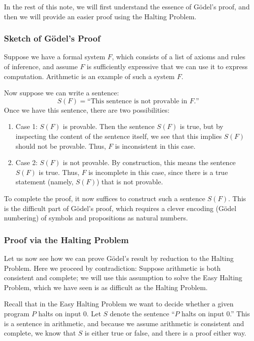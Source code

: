 \documentclass[11pt,fleqn]{article}
\begin{document}
In the rest of this note, we will first understand the essence of G\"odel's proof, and then we will provide an easier proof using the Halting Problem.


\subsubsection*{Sketch of G\"odel's Proof}

Suppose we have a formal system $F$, which consists of a list of axioms and rules of inference, and assume $F$ is sufficiently expressive that we can use it to express computation. Arithmetic is an example of such a system $F$.

Now suppose we can write a sentence:
$$S(F) = \text{``This sentence is not provable in $F$.''}$$
Once we have this sentence, there are two possibilities:
\begin{enumerate}
  \item Case 1: $S(F)$ is provable. Then the sentence $S(F)$ is true, but by inspecting the content of the sentence itself, we see that this implies $S(F)$ should not be provable. Thus, $F$ is inconsistent in this case.
  \item Case 2: $S(F)$ is not provable. By construction, this means the sentence $S(F)$ is true. Thus, $F$ is incomplete in this case, since there is a true statement (namely, $S(F)$) that is not provable.
\end{enumerate}

To complete the proof, it now suffices to construct such a sentence $S(F)$. This is the difficult part of G\"odel's proof, which requires a clever encoding (G\"odel numbering) of symbols and propositions as natural numbers.



\subsubsection*{Proof via the Halting Problem}

Let us now see how we can prove G\"odel's result by reduction to the Halting Problem. Here we proceed by contradiction: Suppose arithmetic is both consistent and complete; we will use this assumption to solve the Easy Halting Problem, which we have seen is as difficult as the Halting Problem.

Recall that in the Easy Halting Problem we want to decide whether a given program $P$ halts on input $0$. Let $S$ denote the sentence ``$P$ halts on input $0$.'' This is a sentence in arithmetic, and because we assume arithmetic is consistent and complete, we know that $S$ is either true or false, and there is a proof either way.
\end{document}
